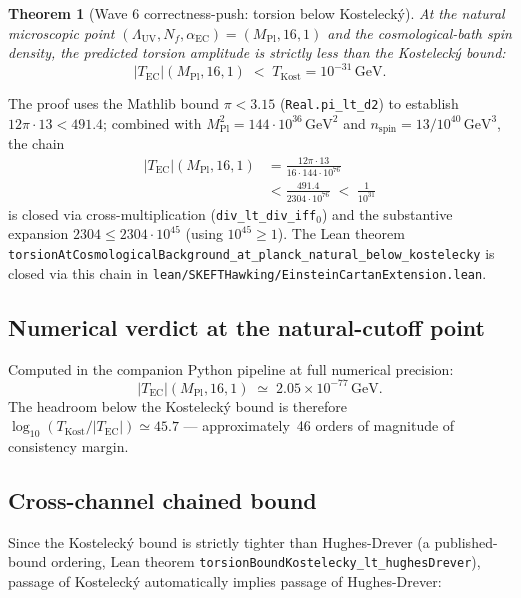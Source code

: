 \documentclass[twocolumn]{revtex4-2}
\newtheorem{theorem}{Theorem}
\newcommand{\Nf}{N_f}
\newcommand{\LambdaUV}{\Lambda_{\mathrm{UV}}}
\newcommand{\MPl}{M_{\mathrm{Pl}}}
\newcommand{\aEC}{\alpha_{\mathrm{EC}}}
\newcommand{\TEC}{T_{\mathrm{EC}}}
\newcommand{\nspin}{n_{\mathrm{spin}}}
\newcommand{\TKost}{T_{\mathrm{Kost}}}
\begin{document}
\begin{theorem}[Wave 6 correctness-push: torsion below Kostelecký]
\label{thm:torsion-below-kost}
At the natural microscopic point $(\LambdaUV,\Nf,\aEC) = (\MPl,16,1)$
and the cosmological-bath spin density, the predicted torsion
amplitude is strictly less than the Kostelecký bound:
\begin{equation}
  |\TEC|(\MPl,16,1) \;<\; \TKost = 10^{-31}\,\mathrm{GeV}.
\end{equation}
\end{theorem}

The proof uses the Mathlib bound $\pi < 3.15$
(\texttt{Real.pi\_lt\_d2}) to establish $12\pi\cdot 13 < 491.4$;
combined with $\MPl^{2} = 144\cdot 10^{36}\,\mathrm{GeV}^{2}$ and
$\nspin = 13/10^{40}\,\mathrm{GeV}^{3}$, the chain
\begin{align*}
  |\TEC|(\MPl,16,1)
  &= \frac{12\pi\cdot 13}{16\cdot 144\cdot 10^{76}} \\
  &< \frac{491.4}{2304\cdot 10^{76}}
  \;<\; \frac{1}{10^{31}}
\end{align*}
is closed via cross-multiplication
(\texttt{div\_lt\_div\_iff$_{0}$}) and the substantive expansion
$2304 \leq 2304\cdot 10^{45}$ (using $10^{45} \geq 1$). The Lean
theorem
\texttt{torsion\-AtCosmological\-Background\-\_at\-\_planck\-\_natural\-\_below\-\_kostelecky}
is closed via this chain in
\texttt{lean/SKEFTHawking/EinsteinCartan\-Extension.lean}.

\subsection{Numerical verdict at the natural-cutoff point}

Computed in the companion Python pipeline at full numerical
precision:
\begin{equation}
  |\TEC|(\MPl,16,1) \;\simeq\; 2.05\times 10^{-77}\,\mathrm{GeV}.
\end{equation}
The headroom below the Kostelecký bound is therefore
$\log_{10}(\TKost/|\TEC|) \simeq 45.7$ --- approximately~46 orders of
magnitude of consistency margin.

\subsection{Cross-channel chained bound}

Since the Kostelecký bound is strictly tighter than Hughes-Drever
(a published-bound ordering, Lean theorem
\texttt{torsionBoundKostelecky\_lt\_hughesDrever}), passage of
Kostelecký automatically implies passage of Hughes-Drever:
\end{document}
